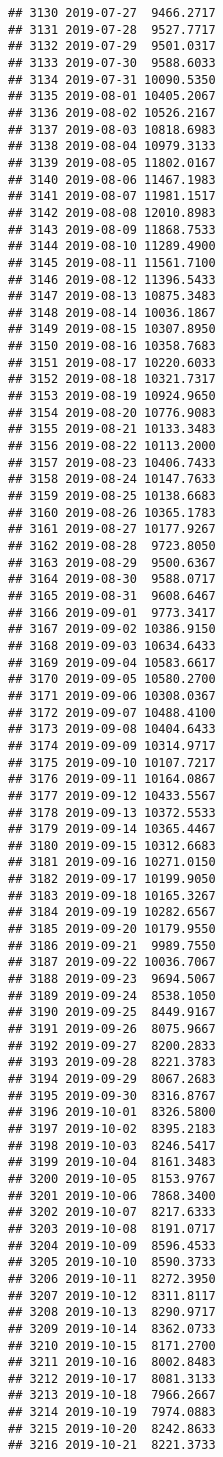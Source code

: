 \documentclass[
]{article}
\begin{document}
\begin{verbatim}
## 3130 2019-07-27  9466.2717
## 3131 2019-07-28  9527.7717
## 3132 2019-07-29  9501.0317
## 3133 2019-07-30  9588.6033
## 3134 2019-07-31 10090.5350
## 3135 2019-08-01 10405.2067
## 3136 2019-08-02 10526.2167
## 3137 2019-08-03 10818.6983
## 3138 2019-08-04 10979.3133
## 3139 2019-08-05 11802.0167
## 3140 2019-08-06 11467.1983
## 3141 2019-08-07 11981.1517
## 3142 2019-08-08 12010.8983
## 3143 2019-08-09 11868.7533
## 3144 2019-08-10 11289.4900
## 3145 2019-08-11 11561.7100
## 3146 2019-08-12 11396.5433
## 3147 2019-08-13 10875.3483
## 3148 2019-08-14 10036.1867
## 3149 2019-08-15 10307.8950
## 3150 2019-08-16 10358.7683
## 3151 2019-08-17 10220.6033
## 3152 2019-08-18 10321.7317
## 3153 2019-08-19 10924.9650
## 3154 2019-08-20 10776.9083
## 3155 2019-08-21 10133.3483
## 3156 2019-08-22 10113.2000
## 3157 2019-08-23 10406.7433
## 3158 2019-08-24 10147.7633
## 3159 2019-08-25 10138.6683
## 3160 2019-08-26 10365.1783
## 3161 2019-08-27 10177.9267
## 3162 2019-08-28  9723.8050
## 3163 2019-08-29  9500.6367
## 3164 2019-08-30  9588.0717
## 3165 2019-08-31  9608.6467
## 3166 2019-09-01  9773.3417
## 3167 2019-09-02 10386.9150
## 3168 2019-09-03 10634.6433
## 3169 2019-09-04 10583.6617
## 3170 2019-09-05 10580.2700
## 3171 2019-09-06 10308.0367
## 3172 2019-09-07 10488.4100
## 3173 2019-09-08 10404.6433
## 3174 2019-09-09 10314.9717
## 3175 2019-09-10 10107.7217
## 3176 2019-09-11 10164.0867
## 3177 2019-09-12 10433.5567
## 3178 2019-09-13 10372.5533
## 3179 2019-09-14 10365.4467
## 3180 2019-09-15 10312.6683
## 3181 2019-09-16 10271.0150
## 3182 2019-09-17 10199.9050
## 3183 2019-09-18 10165.3267
## 3184 2019-09-19 10282.6567
## 3185 2019-09-20 10179.9550
## 3186 2019-09-21  9989.7550
## 3187 2019-09-22 10036.7067
## 3188 2019-09-23  9694.5067
## 3189 2019-09-24  8538.1050
## 3190 2019-09-25  8449.9167
## 3191 2019-09-26  8075.9667
## 3192 2019-09-27  8200.2833
## 3193 2019-09-28  8221.3783
## 3194 2019-09-29  8067.2683
## 3195 2019-09-30  8316.8767
## 3196 2019-10-01  8326.5800
## 3197 2019-10-02  8395.2183
## 3198 2019-10-03  8246.5417
## 3199 2019-10-04  8161.3483
## 3200 2019-10-05  8153.9767
## 3201 2019-10-06  7868.3400
## 3202 2019-10-07  8217.6333
## 3203 2019-10-08  8191.0717
## 3204 2019-10-09  8596.4533
## 3205 2019-10-10  8590.3733
## 3206 2019-10-11  8272.3950
## 3207 2019-10-12  8311.8117
## 3208 2019-10-13  8290.9717
## 3209 2019-10-14  8362.0733
## 3210 2019-10-15  8171.2700
## 3211 2019-10-16  8002.8483
## 3212 2019-10-17  8081.3133
## 3213 2019-10-18  7966.2667
## 3214 2019-10-19  7974.0883
## 3215 2019-10-20  8242.8633
## 3216 2019-10-21  8221.3733

\end{verbatim}
\end{document}
